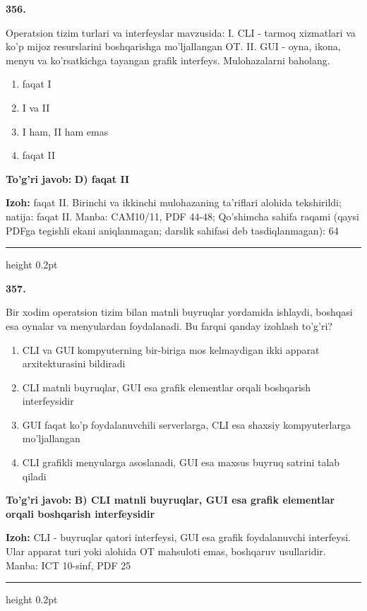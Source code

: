 \documentclass[10pt,a4paper]{article}
\begin{document}
{\bfseries\sffamily\color{ink} 356.}
\par
Operatsion tizim turlari va interfeyslar mavzusida: I. CLI - tarmoq xizmatlari va ko'p mijoz resurslarini boshqarishga mo'ljallangan OT. II. GUI - oyna, ikona, menyu va ko'rsatkichga tayangan grafik interfeys. Mulohazalarni baholang.
\begin{enumerate}[label=\Alph*),leftmargin=9mm]
\item faqat I
\item I va II
\item I ham, II ham emas
\item faqat II
\end{enumerate}
\begin{tcolorbox}[enhanced,breakable,colback=teal!4,colframe=teal!60!black,boxrule=0.45pt,arc=1.2mm,left=2.7mm,right=2.7mm,top=1.8mm,bottom=1.8mm,before skip=2mm,after skip=2mm]
{\bfseries\sffamily\color{teal}To'g'ri javob:} \textbf{D) faqat II}
\par\smallskip
{\bfseries Izoh:} faqat II. Birinchi va ikkinchi mulohazaning ta'riflari alohida tekshirildi; natija: faqat II. Manba: CAM10/11, PDF 44-48; Qo'shimcha sahifa raqami (qaysi PDFga tegishli ekani aniqlanmagan; darslik sahifasi deb tasdiqlanmagan): 64
\end{tcolorbox}
\vspace{2mm}\hrule height 0.2pt\vspace{3mm}

{\bfseries\sffamily\color{ink} 357.}
\par
Bir xodim operatsion tizim bilan matnli buyruqlar yordamida ishlaydi, boshqasi esa oynalar va menyulardan foydalanadi. Bu farqni qanday izohlash to'g'ri?
\begin{enumerate}[label=\Alph*),leftmargin=9mm]
\item CLI va GUI kompyuterning bir-biriga mos kelmaydigan ikki apparat arxitekturasini bildiradi
\item CLI matnli buyruqlar, GUI esa grafik elementlar orqali boshqarish interfeysidir
\item GUI faqat ko'p foydalanuvchili serverlarga, CLI esa shaxsiy kompyuterlarga mo'ljallangan
\item CLI grafikli menyularga asoslanadi, GUI esa maxsus buyruq satrini talab qiladi
\end{enumerate}
\begin{tcolorbox}[enhanced,breakable,colback=teal!4,colframe=teal!60!black,boxrule=0.45pt,arc=1.2mm,left=2.7mm,right=2.7mm,top=1.8mm,bottom=1.8mm,before skip=2mm,after skip=2mm]
{\bfseries\sffamily\color{teal}To'g'ri javob:} \textbf{B) CLI matnli buyruqlar, GUI esa grafik elementlar orqali boshqarish interfeysidir}
\par\smallskip
{\bfseries Izoh:} CLI - buyruqlar qatori interfeysi, GUI esa grafik foydalanuvchi interfeysi. Ular apparat turi yoki alohida OT mahsuloti emas, boshqaruv usullaridir. Manba: ICT 10-sinf, PDF 25
\end{tcolorbox}
\vspace{2mm}\hrule height 0.2pt\vspace{3mm}
\end{document}
